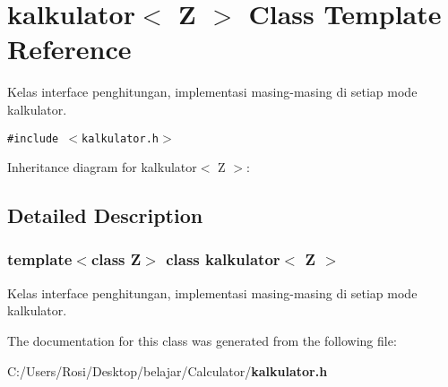 \section{kalkulator$<$ Z $>$ Class Template Reference}
\label{classkalkulator}
Kelas interface penghitungan, implementasi masing-masing di setiap mode kalkulator.  


{\tt \#include $<$kalkulator.h$>$}

Inheritance diagram for kalkulator$<$ Z $>$:

\subsection{Detailed Description}
\subsubsection*{template$<$class Z$>$ class kalkulator$<$ Z $>$}

Kelas interface penghitungan, implementasi masing-masing di setiap mode kalkulator. 



The documentation for this class was generated from the following file:\begin{CompactItemize}
\item 
C:/Users/Rosi/Desktop/belajar/Calculator/{\bf kalkulator.h}\end{CompactItemize}
